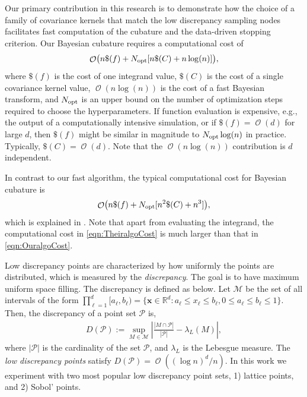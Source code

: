 \documentclass{svjour3}                     %
\DeclareMathOperator{\Order}{{\mathcal O}}
\newcommand{\bm}[1]{\boldsymbol{#1}}
\newcommand{\vx}{\bm{x}}
\newcommand{\opt}{{\textup{opt}}}
\def\abs#1{\ensuremath{\left \lvert #1 \right \rvert}}
\begin{document}
Our primary contribution in this research is to demonstrate how the choice of a family of covariance kernels that match the low discrepancy sampling nodes facilitates fast computation of the cubature and the data-driven stopping criterion.  Our Bayesian cubature requires a computational cost of
\begin{equation} \label{eqn:OuralgoCost}
\Order\bigl(n \$(f) + N_{\opt}[n\$(C) + 
n \log(n)] \bigr),
\end{equation} 
where $\$(f)$ is the cost of one integrand value, $\$(C)$ is the cost of a single covariance kernel value,  $\Order(n \log(n))$ is the cost of a fast Bayesian transform, and $N_{\opt}$ is an upper bound on the number of optimization steps required to choose the hyperparameters. If function evaluation is expensive, e.g., the output of a computationally intensive simulation, or if $\$(f) = \Order(d)$ for large $d$, then $\$(f)$ might be similar in magnitude to $N_{\opt} \log(n)$ in practice.  Typically, $\$(C) = \Order(d)$.  Note that the $\Order(n \log(n))$ contribution is $d$ independent.


In contrast to our fast algorithm, the typical computational cost for Bayesian cubature is
\begin{equation} \label{eqn:TheiralgoCost}
\Order\bigl(n \$(f) + N_{\opt}[n^2\$(C) + n^3] \bigr),
\end{equation} 
which is explained in \cite{JagHic19a}. Note that apart from evaluating the integrand, the computational cost in \eqref{eqn:TheiralgoCost} is much larger than that in \eqref{eqn:OuralgoCost}.  




Low discrepancy points are characterized by how uniformly the points are distributed, which is measured by the \emph{discrepancy}. %
The goal is to have maximum uniform space filling. The discrepancy is defined as below.
Let $\mathcal{M}$ be the set of all intervals of the form $\prod_{\ell=1}^{d} [a_\ell, b_\ell) = \{ \vx \in \mathbb{R}^d : a_\ell \le x_\ell \le b_\ell, 0 \le a_\ell \le b_\ell \le 1 \}$. Then, the discrepancy of a point set $\mathcal{P}$ is,
\begin{align*}
D(\mathcal{P}) := \sup_{M \in \mathcal{M}} 
\abs{ \frac{\abs{M \cap \mathcal{P}}}{\abs{\mathcal{P}}} - \lambda_L(M) },
\end{align*}
where $\abs{\mathcal{P}}$ is the cardinality of the set $\mathcal{P}$, and $\lambda_L$ is the Lebesgue measure.
The \emph{low discrepancy points} satisfy $D(\mathcal{P}) = \Order((\log n)^d/n)$.
In this work we experiment with two most popular low discrepancy point sets, 1) lattice points, and 2) Sobol' points.
\end{document}
